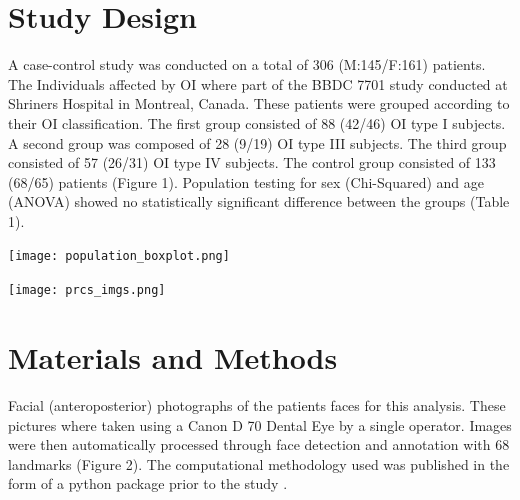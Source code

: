 \documentclass[a0,portrait]{a0poster}
\begin{document}
\begin{multicols}{2}
\color{Black} 
\section{Study Design}

A case-control study was conducted on a total of 306 (M:145/F:161) patients. The Individuals
affected by OI  where part of the BBDC 7701 study conducted at Shriners
Hospital in Montreal, Canada. These patients were grouped according to their OI
classification.  The first group consisted of 88 (42/46) OI type I subjects. A second
group was composed of 28 (9/19) OI type III subjects. The third group consisted
of 57 (26/31) OI type IV subjects. The control group consisted of 133 (68/65)
patients (Figure 1). Population testing for sex (Chi-Squared) and age (ANOVA) showed no statistically significant difference between the groups (Table 1).


\begin{minipage}{0.5\linewidth}
  \centering
\texttt{[image: population\_boxplot.png]}
\end{minipage}
\begin{minipage}{0.5\linewidth}
  \centering
\texttt{[image: prcs\_imgs.png]}                                           
\end{minipage}
      

\section{Materials and Methods}

Facial (anteroposterior) photographs of the patients faces for this analysis.
These pictures where taken using a Canon D 70 Dental Eye by a single operator.
Images were then automatically processed through face detection and
annotation with 68 landmarks (Figure 2). The computational methodology used was published 
in the form of a python package prior to the study \cite{rousseaupfla}. 



\end{multicols}
\end{document}
